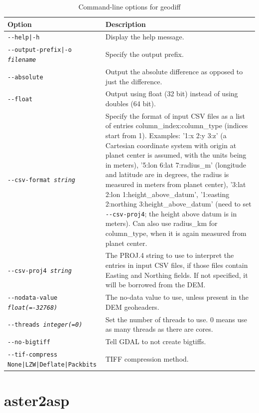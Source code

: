 \begin{longtable}{|l|p{7.5cm}|}
\caption{Command-line options for geodiff}
\label{tbl:geodiff}
\endfirsthead
\endhead
\endfoot
\endlastfoot
\hline
Option & Description \\ \hline \hline
\texttt{-\/-help|-h} & Display the help message. \\ \hline
\texttt{-\/-output-prefix|-o \textit{filename}} & Specify the output prefix. \\ \hline
\texttt{-\/-absolute} & Output the absolute difference as opposed to just the difference. \\ \hline
\texttt{-\/-float} & Output using float (32 bit) instead of using doubles (64 bit). \\ \hline
\texttt{-\/-csv-format \textit{string}} & Specify the format of input
CSV files as a list of entries column\_index:column\_type (indices start
from 1). Examples: '1:x 2:y 3:z' (a Cartesian coordinate system with
origin at planet center is assumed, with the units being in meters),
'5:lon 6:lat 7:radius\_m' (longitude and latitude are in degrees, the
radius is measured in meters from planet center), '3:lat 2:lon
1:height\_above\_datum', '1:easting 2:northing 3:height\_above\_datum'
(need to set \texttt{-\/-csv-proj4}; the height above datum is in
meters). Can also use radius\_km for column\_type, when it is again
measured from planet center. \\ \hline

\texttt{-\/-csv-proj4 \textit{string}} & The PROJ.4 string to use to
interpret the entries in input CSV files, if those files contain Easting
and Northing fields. If not specified, it will be
borrowed from the DEM. \\ \hline

\texttt{-\/-nodata-value \textit{float(=-32768)}} & The no-data value to use, unless present in the DEM geoheaders. \\ \hline
\texttt{-\/-threads \textit{integer(=0)}} & Set the number of threads to use. 0 means use as many threads as there are cores.\\ \hline
\texttt{-\/-no-bigtiff} & Tell GDAL to not create bigtiffs.\\ \hline
\texttt{-\/-tif-compress None|LZW|Deflate|Packbits} & TIFF compression method.\\ \hline
\hline
\end{longtable}


\section{aster2asp}
\label{app:aster}

